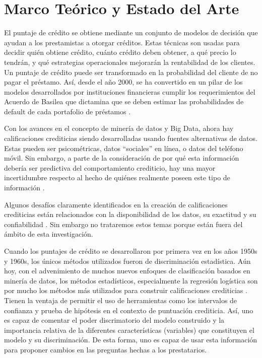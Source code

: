 \chapter{Marco Teórico y Estado del Arte}

El puntaje de crédito se obtiene mediante un conjunto de modelos de decisión que ayudan a los prestamistas a otorgar créditos. Estas técnicas son usadas para decidir quién obtiene crédito, cuánto crédito deben obtener, a qué precio lo tendrán, y qué estrategias operacionales mejorarán la rentabilidad de los clientes. Un puntaje de crédito puede ser transformado en la probabilidad del cliente de no pagar el préstamo. Así, desde el año 2000, se ha convertido en un pilar de los modelos desarrollados por instituciones financieras cumplir los requerimientos del Acuerdo de Basilea que dictamina que se deben estimar las probabilidades de default de cada portafolio de préstamos \cite[1]{thomas2017credit}.

Con los avances en el concepto de minería de datos y Big Data, ahora hay calificaciones crediticias siendo desarrolladas usando fuentes alternativas de datos. Estas pueden ser psicométricas, datos ``sociales'' en línea, o datos del teléfono móvil. Sin embargo, a parte de la consideración de por qué esta información debería ser predictiva del comportamiento crediticio, hay una mayor incertidumbre respecto al hecho de quiénes realmente poseen este tipo de información \cite[18]{thomas2017credit}.

Algunos desafíos claramente identificados en la creación de calificaciones crediticias están relacionados con la disponibilidad de los datos, su exactitud y su confiabilidad \cite[18--19]{thomas2017credit}. Sin embargo no trataremos estos temas porque están fuera del ámbito de esta investigación.

Cuando los puntajes de crédito se desarrollaron por primera vez en los años 1950s y 1960s, los únicos métodos utilizados fueron de discriminación estadística. Aún hoy, con el advenimiento de muchos nuevos enfoques de clasificación basados en minería de datos, los métodos estadísticos, especialmente la regresión logística son por mucho los métodos más utilizados para construir calificaciones crediticias \cite[25]{thomas2017credit}. Tienen la ventaja de permitir el uso de herramientas como los intervalos de confianza y prueba de hipótesis en el contexto de puntuación crediticia. Así, uno es capaz de comentar el poder discrimatorio del modelo construido y la importancia relativa de la diferentes características (variables) que constituyen el modelo y su discriminación. De esta forma, uno es capaz de usar esta información para proponer cambios en las preguntas hechas a los prestatarios.

